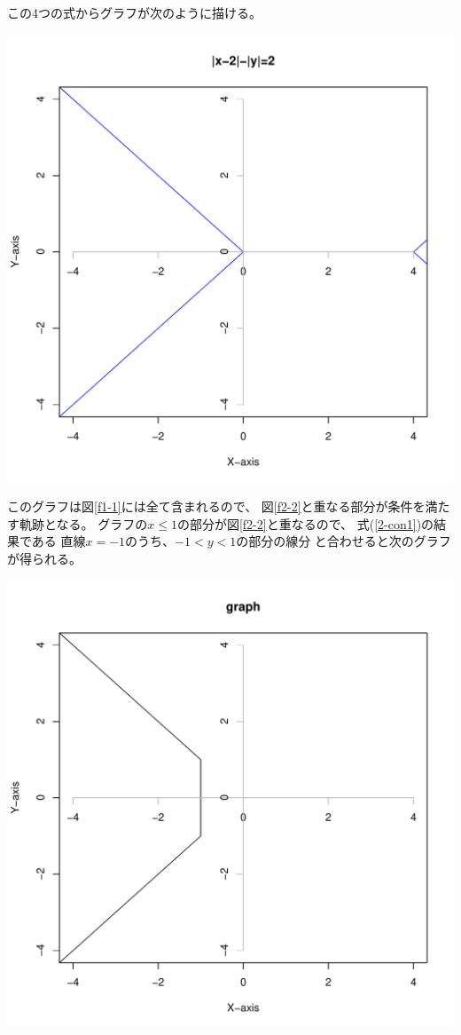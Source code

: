 \documentclass[12pt,b5paper]{ltjsarticle}
\begin{document}
\begin{enumerate}
      この4つの式からグラフが次のように描ける。
      \begin{center}
       \includegraphics[scale=0.5]{graph.pdf}
      \end{center}
      このグラフは図\ref{f1-1}には全て含まれるので、
      図\ref{f2-2}と重なる部分が条件を満たす軌跡となる。
      グラフの$x\leq 1$の部分が図\ref{f2-2}と重なるので、
      式(\ref{2-con1})の結果である
      直線$x=-1$のうち、$-1< y < 1$の部分の線分
      と合わせると次のグラフが得られる。
      \begin{center}
       \includegraphics[scale=0.5]{graph_r.pdf}
      \end{center}


\end{enumerate}
\end{document}
